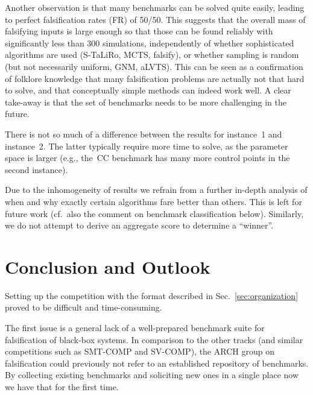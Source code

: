 \documentclass[a4paper]{easychair}
\newcommand{\STaLiRo}{S-TaLiRo\xspace}
\newcommand{\falsify}{falsify\xspace}
\begin{document}
    Another observation is that many benchmarks can be solved quite
    easily, leading to perfect falsification rates (FR) of 50/50.
    This suggests that the overall mass of falsifying inputs is large
    enough so that those can be found reliably with significantly less
    than 300 simulations, independently of whether sophisticated
    algorithms are used (\STaLiRo, MCTS, \falsify), or whether
    sampling is random (but not necessarily uniform, GNM, aLVTS).
    This can be seen as a confirmation of folklore knowledge that many
    falsification problems are actually not that hard to solve, and
    that conceptually simple methods can indeed work well.  A clear
    take-away is that the set of benchmarks needs to be more
    challenging in the future.

    There is not so much of a difference between the results for
    instance~1 and instance~2.  The latter typically require more time
    to solve, as the parameter space is larger (e.g., the~CC benchmark
    has many more control points in the second instance).

    Due to the inhomogeneity of results we refrain from a further
    in-depth analysis of when and why exactly certain algorithms fare
    better than others.  This is left for future work (cf.~also the
    comment on benchmark classification below).  Similarly, we do not
    attempt to derive an aggregate score to determine a ``winner''.

    \section{Conclusion and Outlook}

    Setting up the competition with the format described in
    Sec.~\ref{sec:organization} proved to be difficult and
    time-consuming.

    The first issue is a general lack of a well-prepared benchmark
    suite for falsification of black-box systems.  In comparison to
    the other tracks (and similar competitions such as SMT-COMP and
    SV-COMP), the ARCH group on falsification could previously not
    refer to an established repository of benchmarks.  By collecting
    existing benchmarks and soliciting new ones in a single place now
    we have that for the first time.
\end{document}
